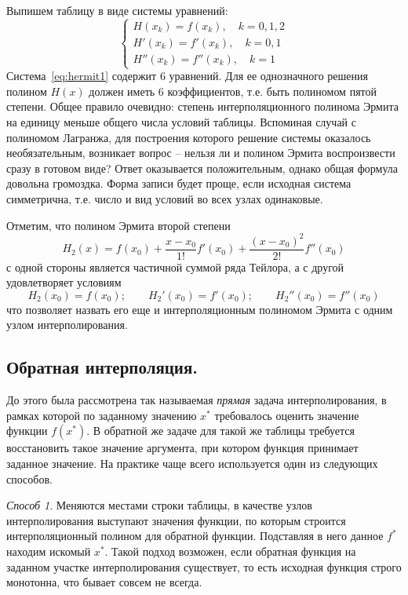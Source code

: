 Выпишем таблицу в виде системы уравнений:
\begin{equation}
    \begin{cases}
        H(x_k) = f(x_k), \quad k = 0, 1, 2 \\
        H'(x_k) = f'(x_k), \quad k = 0, 1 \\
        H''(x_k) = f''(x_k), \quad k = 1
    \end{cases}
    \label{eq:hermit1}
\end{equation}
Система~\eqref{eq:hermit1} содержит 6 уравнений. Для ее однозначного решения полином $H(x)$ должен иметь 6 коэффициентов,
т.е. быть полиномом пятой степени. Общее правило очевидно: степень интерполяционного полинома Эрмита на единицу меньше
общего числа условий таблицы. Вспоминая случай с полиномом Лагранжа, для построения которого решение системы оказалось
необязательным, возникает вопрос -- нельзя ли и полином Эрмита воспроизвести сразу в готовом виде? Ответ оказывается
положительным, однако общая формула довольна громоздка. Форма записи будет проще, если исходная система симметрична,
т.е. число и вид условий во всех узлах одинаковые.
\vspace{5pt}

Отметим, что полином Эрмита второй степени
\begin{equation*}
    H_2(x) = f(x_0) + \frac{x - x_0}{1!}f'(x_0) + \frac{\left( x - x_0 \right)^2}{2!}f''(x_0)
\end{equation*}
с одной стороны является частичной суммой ряда Тейлора, а с другой удовлетворяет условиям
\begin{equation*}
    H_2(x_0) = f(x_0); \qquad H_2'(x_0) = f'(x_0); \qquad H_2''(x_0) = f''(x_0)
\end{equation*}
что позволяет назвать его еще и интерполяционным полиномом Эрмита с одним узлом интерполирования.

\subsection{Обратная интерполяция.}
До этого была рассмотрена так называемая \emph{прямая} задача интерполирования, в рамках которой по заданному значению
$x^{*}$ требовалось оценить значение функции $f(x^{*})$. В обратной же задаче для такой же таблицы требуется восстановить
такое значение аргумента, при котором функция принимает заданное значение. На практике чаще всего используется один из
следующих способов.

\emph{Способ 1}. Меняются местами строки таблицы, в качестве узлов интерполирования выступают значения функции, по
которым строится интерполяционный полином для обратной функции. Подставляя в него данное $f^{*}$ находим искомый $x^{*}$.
Такой подход возможен, если обратная функция на заданном участке интерполирования существует, то есть исходная функция
строго монотонна, что бывает совсем не всегда.

